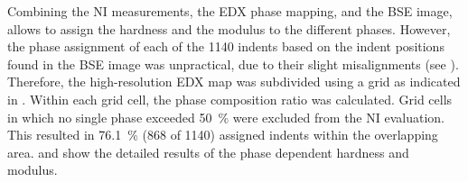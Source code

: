 Combining the \ac{NI} measurements, the \ac{EDX} phase mapping, and the \ac{BSE} image, allows to assign the hardness and the modulus to the different phases.
However, the phase assignment of each of the \num{1140} indents based on the indent positions found in the \ac{BSE} image was unpractical, due to their slight misalignments (see ).
Therefore, the high-resolution \ac{EDX} map was subdivided using a grid as indicated in .
Within each grid cell, the phase composition ratio was calculated.
Grid cells in which no single phase exceeded \qty{50}{\percent} were excluded from the \ac{NI} evaluation.
This resulted in \qty{76.1}{\percent} (\num{868} of \num{1140}) assigned indents within the overlapping area.
 and  show the detailed results of the phase dependent hardness and modulus.

